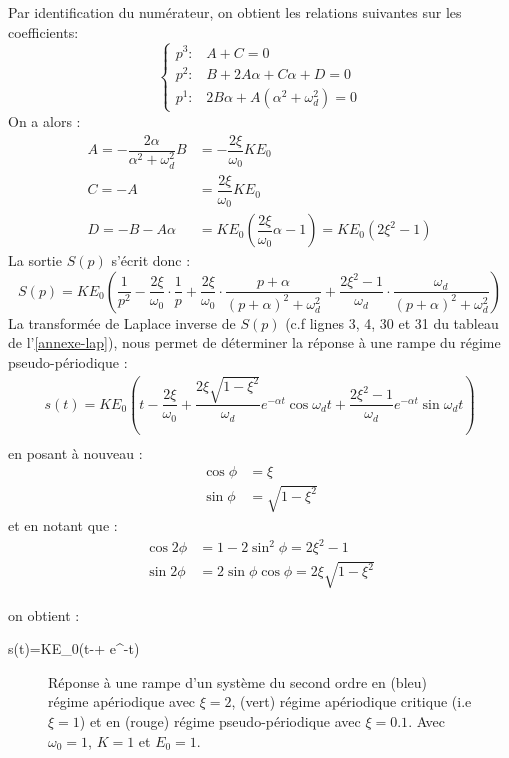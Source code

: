Par identification du numérateur,
on obtient les relations suivantes sur les coefficients:
$$
\begin{cases}
    p^3:\,\,\,\,\,A+C=0\\
    p^2:\,\,\,\,\,B+2A\alpha+C\alpha+D=0\\
    p^1:\,\,\,\,\,2B\alpha+A(\alpha^2+\omega_d^2)=0
\end{cases}
$$
On a alors :
\begin{align*}
    A=-\dfrac{2\alpha}{\alpha^2+\omega_d^2}B&=-\dfrac{2\xi}{\omega_0}KE_0\\
    C=-A&=\dfrac{2\xi}{\omega_0}KE_0\\
    D=-B-A\alpha&=KE_0\left(\dfrac{2\xi}{\omega_0}\alpha-1\right)=KE_0(2\xi^2-1)
\end{align*}
La sortie $S(p)$ s'écrit donc :
$$
S(p)=KE_0\left(\dfrac{1}{p^2}-\dfrac{2\xi}{\omega_0}\cdot
               \dfrac{1}{p}+\dfrac{2\xi}{\omega_0}\cdot
			   \dfrac{p+\alpha}{(p+\alpha)^2+\omega_d^2}+
			   \dfrac{2\xi^2-1}{\omega_d}\cdot\dfrac{\omega_d}
			   {(p+\alpha)^2+\omega_d^2}\right)
$$
La transformée de Laplace inverse de $S(p)$ (c.f lignes 3, 4, 30 
et 31 du tableau de l'\cref{annexe-lap}), nous permet de déterminer la 
réponse à une rampe du régime pseudo-périodique :
\begin{align*}
s(t)=KE_0\left(t-\dfrac{2\xi}{\omega_0}+
\dfrac{2\xi\sqrt{1-\xi^2}}{\omega_d}
e^{-\alpha t}\cos{\omega_d t}+
\dfrac{2\xi^2-1}{\omega_d}e^{-\alpha t}\sin{\omega_d t}
\right)\\
\end{align*}
en posant à nouveau : 
\begin{align*}
    \cos{\phi}&=\xi\\
    \sin{\phi}&=\sqrt{1-\xi^2}
\end{align*}
et en notant que :
\begin{align*}
    \cos{2\phi}&=1-2\sin^2\phi=2\xi^2-1\\
    \sin{2\phi}&=2\sin\phi\cos\phi=2\xi\sqrt{1-\xi^2}
\end{align*}

on obtient :
\begin{bequation}
s(t)=KE_0\left(t-+
	     e^{-\alpha t}\right)
\end{bequation}

\begin{figure}[!t]
    \centering
    
    \caption{Réponse à une rampe d'un système du second ordre en 
            (bleu) régime apériodique avec $\xi=2$, 
            (vert) régime apériodique critique (i.e $\xi=1$) et en 
            (rouge) régime pseudo-périodique avec $\xi=0.1$. 
            Avec $\omega_0=1$, $K=1$ et $E_0=1$. \label{fig-2nd_ramp}}
\end{figure}

